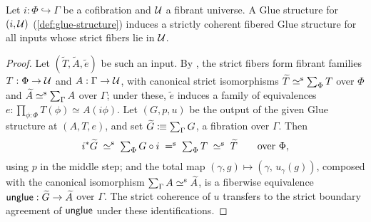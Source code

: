 \begin{longversion}
\begin{definition}
\begin{center}
	\end{center}
\end{definition}

\begin{lemma}\label{lem:family-vs-fibred}
	Let $i:\Phi\hookrightarrow\Gamma$ be a cofibration and $\mathcal{U}$ a
	fibrant universe. A Glue structure for $(i,\mathcal{U})$
	(\cref{def:glue-structure}) induces a strictly coherent fibered Glue
	structure for all inputs whose strict fibers lie in $\mathcal{U}$.
\end{lemma}
\begin{proof}
	Let $(\widetilde{T},\widetilde{A},\widetilde{e})$ be such an input. By
	\citet[Lem.~3.9]{2LTT}, the strict fibers form fibrant families
	$T:\Phi\to\mathcal{U}$ and $A:\Gamma\to\mathcal{U}$, with canonical strict isomorphisms
	$\widetilde{T}\mathrel{\simeq^\textup{s}}\sum_\Phi T$ over $\Phi$ and
	$\widetilde{A}\mathrel{\simeq^\textup{s}}\sum_\Gamma A$ over $\Gamma$; under these,
	$\widetilde{e}$ induces a family of equivalences
	$e:\prod_{\phi:\Phi}T(\phi)\simeq A(i\phi)$. Let $(G,p,u)$ be the
	output of the given Glue structure at $(A,T,e)$, and set
	$\widetilde{G}\mathrel{\vcentcolon\mspace{-1mu}\equiv}\sum_\Gamma G$, a fibration over $\Gamma$. Then
	\[
		i^*\widetilde{G}
		\;\mathrel{\simeq^\textup{s}}\;
		\textstyle\sum_\Phi G\circ i
		\;\mathrel{=^\textup{s}}\;
		\textstyle\sum_\Phi T
		\;\mathrel{\simeq^\textup{s}}\;
		\widetilde{T}
		\qquad\text{over }\Phi,
	\]
	using $p$ in the middle step; and the total map
	$(\gamma,g)\mapsto(\gamma,\,u_\gamma(g))$, composed with the canonical
	isomorphism $\sum_\Gamma A\mathrel{\simeq^\textup{s}}\widetilde{A}$, is a
	fiberwise equivalence $\mathsf{unglue}:\widetilde{G}\to\widetilde{A}$ over
	$\Gamma$. The strict coherence of $u$ transfers to the strict boundary
	agreement of $\mathsf{unglue}$ under these identifications.
\end{proof}
\end{longversion}


